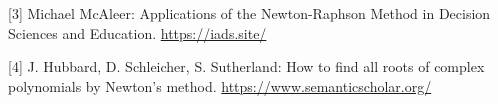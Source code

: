 \documentclass{article}
\begin{document}
\noindent\label{id3}[3] Michael McAleer: Applications of the Newton-Raphson Method in Decision Sciences and Education. \href{https://iads.site/wp-content/uploads/papers/2019/Applications-of-the-Newton-Raphson-Method-in-Decision-Sciences-and-Education.pdf}{https://iads.site/}
\vspace{}

\noindent\label{id4}[4] J. Hubbard, D. Schleicher, S. Sutherland: How to find all roots of complex polynomials by Newton’s method. \href{https://www.semanticscholar.org/paper/How-to-find-all-roots-of-complex-polynomials-by-Hubbard-Schleicher/227bd87bed09b7541725ac3bd30dc145f9a984d7}{https://www.semanticscholar.org/}
\vspace{10}
\end{document}
